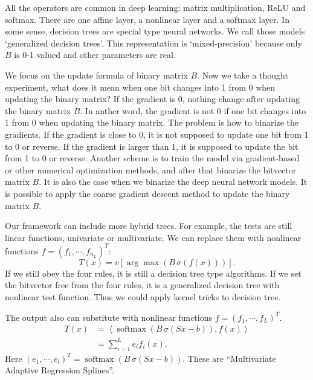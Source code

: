 \documentclass[UTF8]{article}
\begin{document}
All the operators are common in deep learning:
matrix multiplication, ReLU and softmax.
There are one affine layer, a nonlinear layer and a softmax layer.
In some sense, decision trees are special type neural networks.
We call those models `generalized decision trees'.
This representation is `mixed-precision'
because only $B$ is 0-1 valued \footnotemark
{}
and other parameters are real.

We focus on the update formula of binary matrix $B$.
Now we take a thought experiment, what does it mean
when one bit changes into 1 from 0 when updating the binary matrix?
If the gradient is 0, nothing change after updating the binary matrix $B$.
In anther word, the gradient is not 0
if one bit changes into 1 from 0 when updating the binary matrix.
The problem is how to binarize the gradients.
If the gradient is close to 0, it is not supposed to update one bit from 1 to 0 or reverse.
If the gradient is larger than 1, it is supposed to update the bit from 1 to 0 or reverse.
Another scheme is to train the model
via gradient-based or other numerical optimization methods,
and after that binarize the bitvector matrix $B$.
It is also the case when we binarize the deep neural network models.
It is possible to  apply the coarse gradient descent method  to update the binary matrix $B$.

Our framework can include more hybrid trees.
For example, the tests are still linear functions, univariate or multivariate.
We can replace them with nonlinear functions $f=(f_1,\cdots,f_{n_L})^T$:
\begin{equation}\label{GT1}
  T(x)=v[\arg\max(B\,\sigma(f(x)))].\nonumber
\end{equation}
If we still obey the four rules, it is still a decision tree type algorithms.
If we set the bitvector free from the four rules,
it is a generalized decision tree with nonlinear test function.
Thus we could apply kernel tricks to decision tree.

The output also can substitute with nonlinear functions $f=(f_1,\cdots,f_{L})^T$.
\begin{equation}\label{GT2}
\begin{split}
  T(x) &=\left<\operatorname{softmax}(B\,\sigma(Sx-b)), f(x)\right> \\ \nonumber
       &=\sum_{i=1}^{L}e_i f_i(x)\nonumber.
\end{split}
\end{equation}
Here $(e_1,\cdots,e_l)^T=\operatorname{softmax}(B\,\sigma(Sx-b))$.
These are ``Multivariate Adaptive Regression Splines''.
\end{document}
